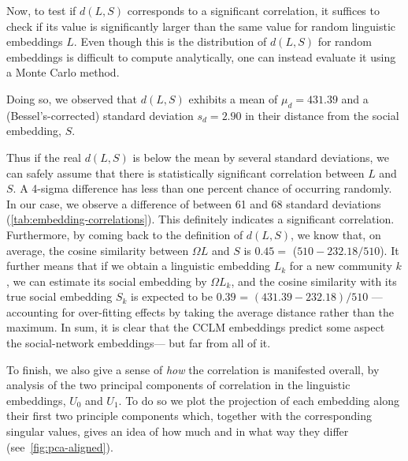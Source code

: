 \documentclass[11pt]{article}
\begin{document}
Now, to test if \(d(L,S)\) corresponds to a significant correlation,
it suffices to check if its value is significantly larger than the same
value for random linguistic embeddings \(L\). Even though this is the
distribution of \(d(L,S)\) for random embeddings is difficult to
compute analytically, one can instead evaluate it using a Monte Carlo
method.

Doing so, we observed that \(d(L,S)\) exhibits a mean of
\(μ_d=431.39\) and a (Bessel's-corrected) standard deviation
\(s_d=2.90\) in their distance from the social embedding,
\(S\). %


Thus if the real \(d(L,S)\) is below the mean by several standard
deviations, we can safely assume that there is statistically
significant correlation between \(L\) and \(S\). A 4-sigma difference
has less than one percent chance of occurring randomly. In our case,
we observe a difference of between 61 and 68 standard deviations
(\cref{tab:embedding-correlations}). This definitely indicates a
significant correlation.  Furthermore, by coming back to the
definition of \(d(L,S)\), we know that, on average, the cosine
similarity between \(ΩL\) and \(S\) is \(0.45 = \) (\(510 - 232.18 / 510\)).  It
further means that if we obtain a linguistic embedding \(L_k\) for a
new community $k$, we can estimate its social embedding by \(ΩL_k\),
and the cosine similarity with its true social embedding \(S_k\) is
expected to be \(0.39\) = \((431.39 - 232.18) / 510\) --- accounting for
over-fitting effects by taking the average distance rather than the
maximum. 
In sum, it is clear that the CCLM embeddings predict some aspect the social-network embeddings--- but far from all of it.

To finish, we also give a sense of \emph{how} the correlation is manifested overall, by
analysis of the two principal components of correlation in the
linguistic embeddings, \(U_0\) and \(U_1\). To do so we plot the
projection of each embedding along their first two principle components
which, together with the corresponding singular values, gives an idea
of how much and in what way they differ (see~\cref{fig:pca-aligned}).


\begin{figure*}[t]
    \centering
    \PCAAligned 
  \caption{First two components of the aligned social (left) and linguistic (right) embeddings,
    where the lingusitic embedding is taken from the LTSM with $l_c=1$.
    Correlation between these directions is given by $\sigma_0 = 53.4$ and $\sigma_1 = 35.6$.
    Colors are assigned by k-means clustering of the social embedding. 
    This figure is reproduced in the supplementary materials with a legend that helps 
    to characterise the clusters.
  }
  \label{fig:pca-aligned}
\end{figure*}
\end{document}
